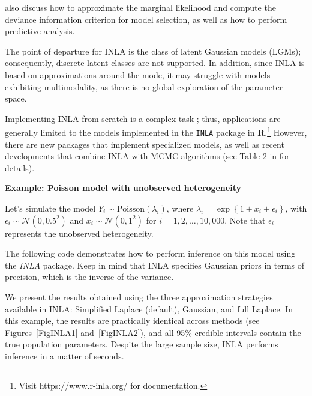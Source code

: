 \cite{rue2009approximate} also discuss how to approximate the marginal likelihood and compute the deviance information criterion \cite{spiegelhalter2002bayesian} for model selection, as well as how to perform predictive analysis. 

The point of departure for INLA is the class of latent Gaussian models (LGMs); consequently, discrete latent classes are not supported. In addition, since INLA is based on approximations around the mode, it may struggle with models exhibiting multimodality, as there is no global exploration of the parameter space. 

Implementing INLA from scratch is a complex task \cite{martino2019integrated}; thus, applications are generally limited to the models implemented in the \texttt{INLA} package in \textbf{R}.\footnote{Visit https://www.r-inla.org/ for documentation.} However, there are new packages that implement specialized models, as well as recent developments that combine INLA with MCMC algorithms (see Table 2 in \cite{martino2019integrated} for details). 


\textbf{Example: Poisson model with unobserved heterogeneity}

Let's simulate the model $Y_i \sim \text{Poisson}(\lambda_i)$, where $\lambda_i = \exp\left\{1 + x_i + \epsilon_i\right\}$, with $\epsilon_i \sim \mathcal{N}(0, 0.5^2)$ and $x_i \sim \mathcal{N}(0, 1^2)$ for $i = 1, 2, \dots, 10,\!000$. Note that $\epsilon_i$ represents the unobserved heterogeneity.

The following code demonstrates how to perform inference on this model using the \textit{INLA} package. Keep in mind that INLA specifies Gaussian priors in terms of precision, which is the inverse of the variance.

We present the results obtained using the three approximation strategies available in INLA: Simplified Laplace (default), Gaussian, and full Laplace. In this example, the results are practically identical across methods (see Figures~\ref{FigINLA1} and~\ref{FigINLA2}), and all 95\% credible intervals contain the true population parameters. Despite the large sample size, INLA performs inference in a matter of seconds.

